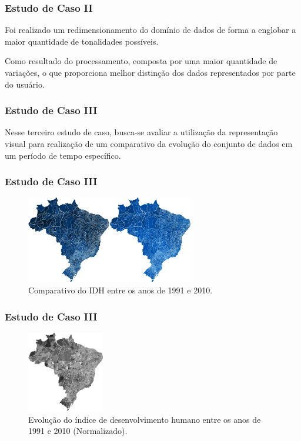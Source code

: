 \documentclass[aspectratio=169]{beamer}
\begin{document}
\begin{frame}
\frametitle{Estudo de Caso II}
\justifying

Foi realizado um redimensionamento do domínio de dados de forma a englobar
a maior quantidade de tonalidades possíveis.

Como resultado do processamento, composta por uma maior quantidade de variações, o que proporciona melhor distinção dos dados representados por parte do usuário.

\end{frame}

\begin{frame}
\frametitle{Estudo de Caso III}
\justifying

Nesse terceiro estudo de caso, busca-se avaliar a utilização da representação visual para realização de um comparativo da evolução do conjunto de dados em um período de tempo específico.

\end{frame}

\begin{frame}
\frametitle{Estudo de Caso III}
\justifying


\begin{figure}
\centering
\includegraphics[width=0.65\textwidth]{images/comparativo-idh.png}
\caption{Comparativo do IDH entre os anos de 1991 e 2010.}
\end{figure}

\end{frame}

\begin{frame}
\frametitle{Estudo de Caso III}
\justifying


\begin{figure}
\centering
\includegraphics[width=0.3\textwidth]{images/evolucao.png}
\caption{Evolução do índice de desenvolvimento humano entre os anos de 1991 e 2010 (Normalizado).}
\end{figure}

\end{frame}
\end{document}
